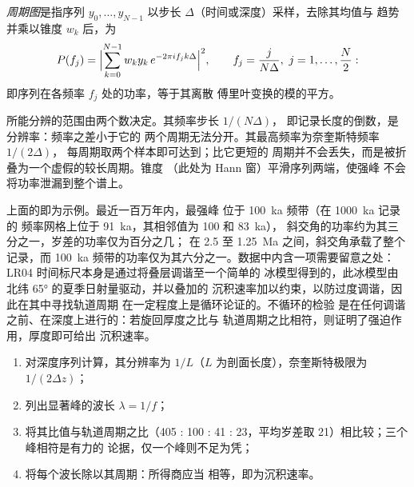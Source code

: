 \begin{definition}[周期图]\label{def:b3:sequence-stratigraphy:periodogram}
\emph{周期图}是指序列 $y_0, \dots, y_{N-1}$
以步长 $\Delta$（时间或深度）采样，去除其均值与
趋势并乘以锥度 $w_k$ 后，为
\[
P(f_j) = \Bigl|\sum_{k=0}^{N-1} w_k y_k\, e^{-2\pi i f_j k\Delta}\Bigr|^2,
\qquad f_j = \frac{j}{N\Delta},\ j = 1, \dots, \frac N2:
\]
即序列在各频率 $f_j$ 处的功率，等于其离散
傅里叶变换的模的平方。
\end{definition}

所能分辨的范围由两个数决定。其频率步长 $1/(N\Delta)$，
即记录长度的倒数，是分辨率：频率之差小于它的
两个周期无法分开。其最高频率为奈奎斯特频率 $1/(2\Delta)$，
每周期取两个样本即可达到；比它更短的
周期并不会丢失，而是被折叠为一个虚假的较长周期。锥度
（此处为 Hann 窗）平滑序列两端，使强峰
不会将功率泄漏到整个谱上。


上面的即为示例。最近一百万年内，最强峰
位于 \qty{100}{ka} 频带（在 \qty{1000}{ka} 记录的
频率网格上位于 \qty{91}{ka}，其相邻值为 100 和 \qty{83}{ka}），
斜交角的功率约为其三分之一，岁差的功率仅为百分之几；
在 2.5 至 \qty{1.25}{Ma} 之间，斜交角承载了整个记录，而
\qty{100}{ka} 频带的功率仅为其六分之一。数据中内含一项需要留意之处：
LR04 时间标尺本身是通过将叠层调谐至一个简单的
冰模型得到的，此冰模型由北纬 \ang{65} 的夏季日射量驱动，并以叠加的
沉积速率加以约束，以防过度调谐，因此在其中寻找轨道周期
在一定程度上是循环论证的。不循环的检验
是在任何调谐之前、在深度上进行的：若旋回厚度之比与
轨道周期之比相符，则证明了强迫作用，厚度即可给出
沉积速率。

\begin{method}[由旋回厚度求沉积速率]\label{met:b3:sequence-stratigraphy:cycles}
\begin{enumerate}
\item 对深度序列计算，其分辨率为
  $1/L$（$L$ 为剖面长度），奈奎斯特极限为 $1/(2\Delta z)$；
\item 列出显著峰的波长 $\lambda = 1/f$；
\item 将其比值与轨道周期之比（405 : 100 : 41
  : 23，平均岁差取 21）相比较；三个峰相符是有力的
  论据，仅一个峰则不足为凭；
\item 将每个波长除以其周期：所得商应当
  相等，即为沉积速率。
\end{enumerate}
\end{method}

